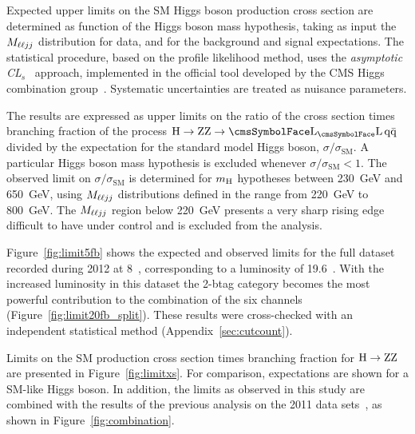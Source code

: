 Expected upper limits on the SM Higgs boson production cross section are determined as function of the Higgs boson mass hypothesis, taking as input the $M_{\ell\ell jj}$ distribution for data, and for the background and signal expectations. The statistical procedure, based on the profile likelihood method, uses the \textit{asymptotic CL$_s$}~\cite{AsymptCLs} approach, implemented in the official tool developed by the CMS Higgs combination group~\cite{HiggsLimitTWiki}. Systematic uncertainties are treated as nuisance parameters.

The results are expressed as upper limits on the ratio of the cross section times branching fraction of the process $\Htollqq\ $ divided by the expectation for the standard model Higgs boson, $\sigma / \sigma_\mathrm{SM}$. A particular Higgs boson mass hypothesis is excluded whenever \mbox{$\sigma / \sigma_\mathrm{SM} < 1$}. The observed limit on $\sigma / \sigma_\mathrm{SM}$ is determined for $m_{\mathrm{H}}$ hypotheses between 230~GeV and 650~GeV, using $M_{\ell\ell jj}$ distributions defined in the range from 220~GeV to 800~GeV. The $M_{\ell\ell jj}$ region below 220~GeV presents a very sharp rising edge difficult to have under control and is excluded from the analysis.

Figure~\ref{fig:limit5fb} shows the expected and observed limits for the full dataset recorded during 2012 at 8~\TeV{}, corresponding to a luminosity of 19.6~\fbinv{}. With the increased luminosity in this dataset the 2-btag category becomes the most powerful contribution to the combination of the six channels (Figure~\ref{fig:limit20fb_split}). These results were cross-checked with an independent statistical method (Appendix~\ref{sec:cutcount}).

Limits on the SM production cross section times branching fraction for $\mathrm{\mathrm{H}\rightarrow\mathrm{Z}\mathrm{Z}}$ are presented in Figure~\ref{fig:limitxs}. For comparison, expectations are shown for a SM-like Higgs boson. In addition, the limits as observed in this study are combined with the results of the previous analysis on the 2011 data sets~\cite{HIG-11-027}, as shown in Figure~\ref{fig:combination}.


